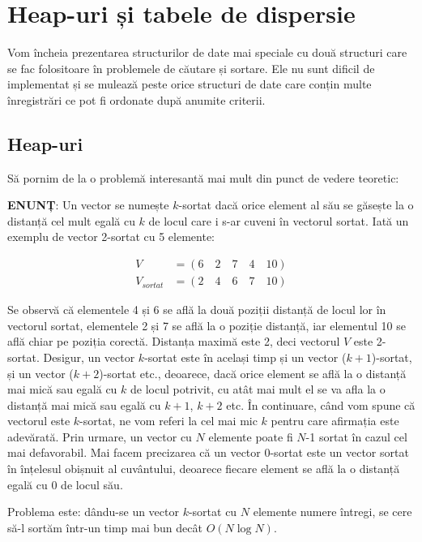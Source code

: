 \chapter{Heap-uri și tabele de dispersie}

Vom încheia prezentarea structurilor de date mai speciale cu două structuri
care se fac folositoare în problemele de căutare și sortare. Ele nu sunt
dificil de implementat și se mulează peste orice structuri de date care conțin
multe înregistrări ce pot fi ordonate după anumite criterii.

\section{Heap-uri}

Să pornim de la o problemă interesantă mai mult din punct de vedere teoretic:

{\bf ENUNȚ}: Un vector se numește $k$-sortat dacă orice element al său se
găsește la o distanță cel mult egală cu $k$ de locul care i s-ar cuveni în
vectorul sortat. Iată un exemplu de vector 2-sortat cu 5 elemente:

\begin{align}
V & = (6 \quad 2 \quad 7 \quad 4 \quad 10) \\
V_{sortat} & = (2 \quad 4 \quad 6 \quad 7 \quad 10)
\end{align}

Se observă că elementele 4 și 6 se află la două poziții distanță de locul lor
în vectorul sortat, elementele 2 și 7 se află la o poziție distanță, iar
elementul 10 se află chiar pe poziția corectă. Distanța maximă este 2, deci
vectorul $V$ este 2-sortat. Desigur, un vector $k$-sortat este în același timp
și un vector ($k+1$)-sortat, și un vector ($k+2$)-sortat etc., deoarece, dacă
orice element se află la o distanță mai mică sau egală cu $k$ de locul
potrivit, cu atât mai mult el se va afla la o distanță mai mică sau egală cu
$k+1$, $k+2$ etc. În continuare, când vom spune că vectorul este $k$-sortat,
ne vom referi la cel mai mic $k$ pentru care afirmația este adevărată. Prin
urmare, un vector cu $N$ elemente poate fi $N$-1 sortat în cazul cel mai
defavorabil. Mai facem precizarea că un vector 0-sortat este un vector sortat
în înțelesul obișnuit al cuvântului, deoarece fiecare element se află la o
distanță egală cu 0 de locul său.

Problema este: dându-se un vector $k$-sortat cu $N$ elemente numere întregi,
se cere să-l sortăm într-un timp mai bun decât $O(N \log N)$.

